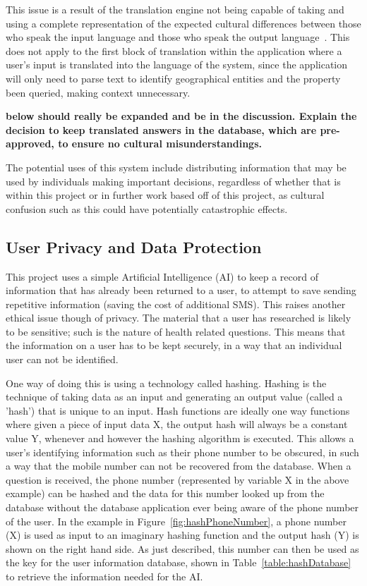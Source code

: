 \documentclass[authoryearcitations]{UoYCSproject}
\begin{document}
This issue is a result of the translation engine not being capable of taking and using a complete representation of the expected cultural differences between those who speak the input language and those who speak the output language~\cite{melby2006can}. This does not apply to the first block of translation within the application where a user's input is translated into the language of the system, since the application will only need to parse text to identify geographical entities and the property been queried, making context unnecessary.

{\bf below should really be expanded and be in the discussion.  Explain the decision to keep translated answers in the database, which are pre-approved, to ensure no cultural misunderstandings.}

The potential uses of this system include distributing information that may be used by individuals making important decisions, regardless of whether that is within this project or in further work based off of this project, as cultural confusion such as this could have potentially catastrophic effects.

\subsection{User Privacy and Data Protection}
\label{subsubsec:userPrivacyAndDataProtection}
This project uses a simple Artificial Intelligence (AI) to keep a record of information that has already been returned to a user, to attempt to save sending repetitive information (saving the cost of additional SMS).  This raises another ethical issue though of privacy.  The material that a user has researched is likely to be sensitive; such is the nature of health related questions.  This means that the information on a user has to be kept securely, in a way that an individual user can not be identified.

One way of doing this is using a technology called hashing.  Hashing is the technique of taking data as an input and generating an output value (called a 'hash') that is unique to an input.  Hash functions are ideally one way functions where given a piece of input data X, the output hash will always be a constant value Y, whenever and however the hashing algorithm is executed.  This allows a user's identifying information such as their phone number to be obscured, in such a way that the mobile number can not be recovered from the database.  When a question is received, the phone number (represented by variable X in the above example) can be hashed and the data for this number looked up from the database without the database application ever being aware of the phone number of the user.  In the example in Figure~\ref{fig:hashPhoneNumber}, a phone number (X) is used as input to an imaginary hashing function and the output hash (Y) is shown on the right hand side.  As just described, this number can then be used as the key for the user information database, shown in Table~\ref{table:hashDatabase} to retrieve the information needed for the AI.
\end{document}
